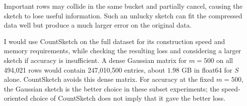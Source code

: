 \documentclass[11pt,a4paper]{article}
\begin{document}
Important rows may collide in the same bucket and partially cancel, causing
the sketch to lose useful information. Such an unlucky sketch can fit the
compressed data well but produce a much larger error on the original data.

I would use CountSketch on the full dataset for its construction speed and
memory requirements, while checking the resulting loss and considering a
larger sketch if accuracy is insufficient. A dense Gaussian matrix for
$m=500$ on all 494,021 rows would contain 247,010,500 entries, about
$1.98$ GB in float64 for $S$ alone. CountSketch avoids this dense matrix.
For accuracy at the fixed $m=500$, the Gaussian sketch is the better choice
in these subset experiments; the speed-oriented choice of CountSketch
does not imply that it gave the better loss.

\clearpage
\end{document}
